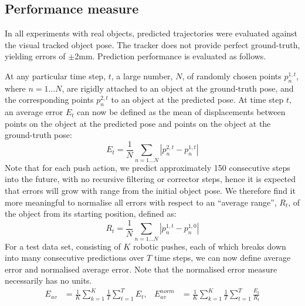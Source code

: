 
\subsection{Performance measure}\label{sec:Experiment.Performance}

In all experiments with real objects, predicted trajectories were evaluated against the visual tracked object pose. The tracker does not provide perfect ground-truth, yielding errors of $\pm$2mm. Prediction performance is evaluated as follows.

At any particular time step, $t$, a large number, $N$, of randomly chosen points $p_{n}^{1,t}$, where $n=1 \ldots N$, are rigidly attached to an object at the ground-truth pose, and the corresponding points $p_{n}^{2,t}$ to an object at the predicted pose. At time step $t$, an average error $E_t$ can now be defined as the mean of displacements between points on the object at the predicted pose and points on the object at the ground-truth pose:
\begin{equation}
E_t = \frac{1}{N} \mathop{\sum}_{n=1 \ldots N}|p_{n}^{2,t}-p_{n}^{1,t}|
\label{eq:defn_Rt}
\end{equation}
Note that for each push action, we predict approximately 150
consecutive steps into the future, with no recursive filtering or
corrector steps, hence it is expected that errors will grow with range
from the initial object pose. We therefore find it more meaningful to
normalise all errors with respect to an ``average range'', $R_t$, of
the object from its starting position, defined as:
\begin{equation}
R_t = \frac{1}{N} \mathop{\sum}_{n=1 \ldots N}|p_{n}^{1,t}-p_{n}^{1,0}|
\label{eq:defn_Et}
\end{equation}
For a test data set, consisting of $K$ robotic pushes, each of which breaks down into many consecutive predictions over $T$ time steps, we can now define average error and normalised average error. Note that the normalised error measure necessarily has no units.
\begin{align}
E_{av} &= \frac{1}{K} \mathop{\sum}_{k=1}^{K} \frac{1}{T} \mathop{\sum}_{t=1}^{T} E_t,
&E_{av}^{norm} &= \frac{1}{K} \mathop{\sum}_{k=1}^{K} \frac{1}{T} \mathop{\sum}_{t=1}^{T} \frac{E_t}{R_t}
\label{eq:Error1}
\end{align}


